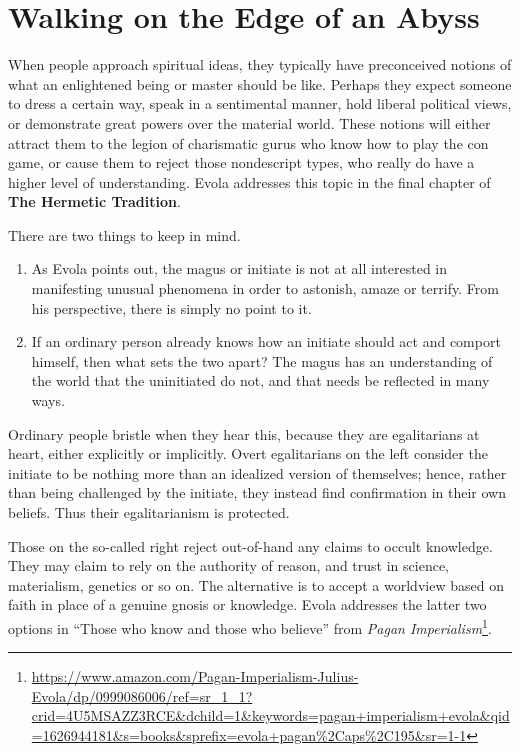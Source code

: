 \section{Walking on the Edge of an Abyss}

When people approach spiritual ideas, they typically have preconceived notions of what an enlightened being or master should be like. Perhaps they expect someone to dress a certain way, speak in a sentimental manner, hold liberal political views, or demonstrate great powers over the material world. These notions will either attract them to the legion of charismatic gurus who know how to play the con game, or cause them to reject those nondescript types, who really do have a higher level of understanding. Evola addresses this topic in the final chapter of \textbf{The Hermetic Tradition}.


There are two things to keep in mind.

\begin{enumerate}


\item As Evola points out, the magus or initiate is not at all interested in manifesting unusual phenomena in order to astonish, amaze or terrify. From his perspective, there is simply no point to it.

\item If an ordinary person already knows how an initiate should act and comport himself, then what sets the two apart? The magus has an understanding of the world that the uninitiated do not, and that needs be reflected in many ways.
\end{enumerate}


Ordinary people bristle when they hear this, because they are egalitarians at heart, either explicitly or implicitly. Overt egalitarians on the left consider the initiate to be nothing more than an idealized version of themselves; hence, rather than being challenged by the initiate, they instead find confirmation in their own beliefs. Thus their egalitarianism is protected.

Those on the so-called right reject out-of-hand any claims to occult knowledge. They may claim to rely on the authority of reason, and trust in science, materialism, genetics or so on. The alternative is to accept a worldview based on faith in place of a genuine gnosis or knowledge. Evola addresses the latter two options in ``Those who know and those who believe'' from \textit{Pagan Imperialism}\footnote{\url{https://www.amazon.com/Pagan-Imperialism-Julius-Evola/dp/0999086006/ref=sr\_1\_1?crid=4U5MSAZZ3RCE&dchild=1&keywords=pagan+imperialism+evola&qid=1626944181&s=books&sprefix=evola+pagan\%2Caps\%2C195&sr=1-1}}.

